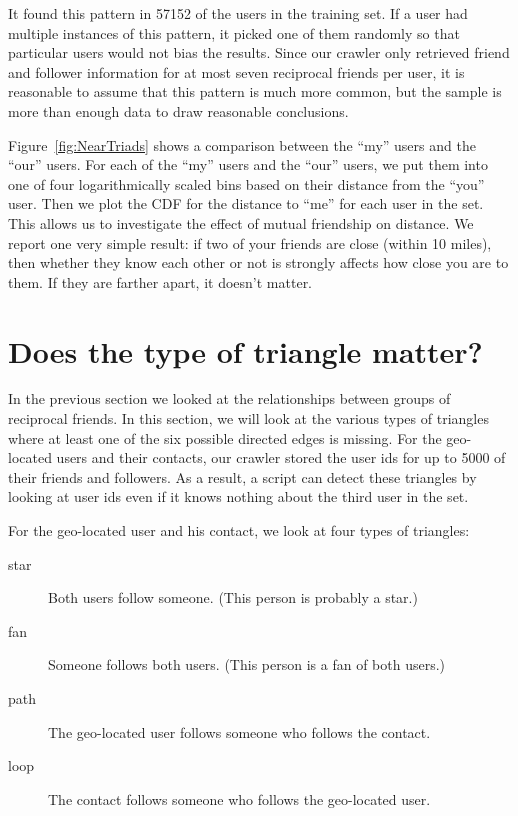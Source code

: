 It found this pattern in 57152 of the users in the training set.
If a user had multiple instances of this pattern, it picked one of them
randomly so that particular users would not bias the results.
Since our crawler only retrieved friend and follower information for at most
seven reciprocal friends per user, it is reasonable to assume that this pattern
is much more common, but the sample is more than enough data to draw reasonable
conclusions.

Figure~\ref{fig:NearTriads} shows a comparison between the ``my'' users and the
``our'' users.
For each of the ``my'' users and the ``our'' users, we put them into one of
four logarithmically scaled bins based on their distance from the ``you'' user.
Then we plot the CDF for the distance to ``me'' for each user in the set. This
allows us to investigate the effect of mutual friendship on distance.
We report one very simple result: if two of your friends are close (within 10
miles), then whether they know each other or not is strongly affects how close
you are to them. If they are farther apart, it doesn't matter.

\section{Does the type of triangle matter?}


In the previous section we looked at the relationships between groups of
reciprocal friends.
In this section, we will look at the various types of triangles where at least
one of the six possible directed edges is missing.
For the geo-located users and their contacts, our crawler stored the user ids
for up to 5000 of their friends and followers.
As a result, a script can detect these triangles by looking at user ids even if
it knows nothing about the third user in the set.

For the geo-located user and his contact, we look at four types of triangles:
\begin{description}
\item[star] Both users follow someone. (This person is probably a star.)
\item[fan] Someone follows both users. (This person is a fan of both users.)
\item[path] The geo-located user follows someone who follows the contact.
\item[loop] The contact follows someone who follows the geo-located user.
\end{description}

